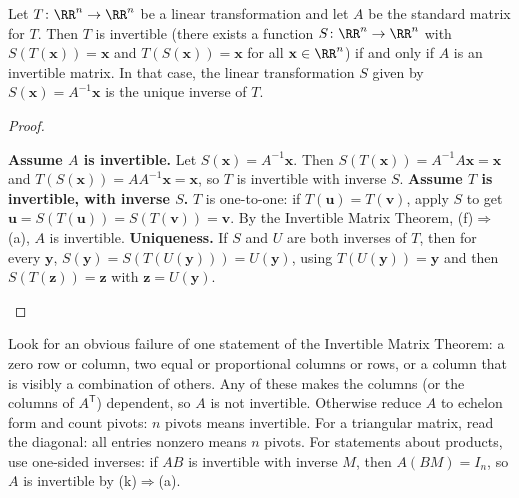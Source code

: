 \documentclass[10pt]{scrartcl}
\newcommand{\vv}[1]{\mathbf{#1}}
\begin{document}
\begin{fig}
\end{fig}

\begin{theorem*}
  Let $T\colon\RR^n\to\RR^n$ be a linear transformation and let $A$ be the standard matrix for $T$. Then $T$ is invertible (there exists a function $S\colon\RR^n\to\RR^n$ with $S(T(\vv x))=\vv x$ and $T(S(\vv x))=\vv x$ for all $\vv x\in\RR^n$) if and only if $A$ is an invertible matrix. In that case, the linear transformation $S$ given by $S(\vv x)=A^{-1}\vv x$ is the unique inverse of $T$.
\end{theorem*}
\begin{proof}
  \begin{steps}
    \ii \textbf{Assume $A$ is invertible.} Let $S(\vv x)=A^{-1}\vv x$. Then $S(T(\vv x))=A^{-1}A\vv x=\vv x$ and $T(S(\vv x))=AA^{-1}\vv x=\vv x$, so $T$ is invertible with inverse $S$.
    \ii \textbf{Assume $T$ is invertible, with inverse $S$.} $T$ is one-to-one: if $T(\vv u)=T(\vv v)$, apply $S$ to get $\vv u=S(T(\vv u))=S(T(\vv v))=\vv v$. By the Invertible Matrix Theorem, (f)$\Rightarrow$(a), $A$ is invertible.
    \ii \textbf{Uniqueness.} If $S$ and $U$ are both inverses of $T$, then for every $\vv y$, $S(\vv y)=S(T(U(\vv y)))=U(\vv y)$, using $T(U(\vv y))=\vv y$ and then $S(T(\vv z))=\vv z$ with $\vv z=U(\vv y)$.
  \end{steps}
\end{proof}

\begin{steps}
  \ii Look for an obvious failure of one statement of the Invertible Matrix Theorem: a zero row or column, two equal or proportional columns or rows, or a column that is visibly a combination of others. Any of these makes the columns (or the columns of $A^{\mathsf T}$) dependent, so $A$ is not invertible.
  \ii Otherwise reduce $A$ to echelon form and count pivots: $n$ pivots means invertible. For a triangular matrix, read the diagonal: all entries nonzero means $n$ pivots.
  \ii For statements about products, use one-sided inverses: if $AB$ is invertible with inverse $M$, then $A(BM)=I_n$, so $A$ is invertible by (k)$\Rightarrow$(a).
\end{steps}
\end{document}
